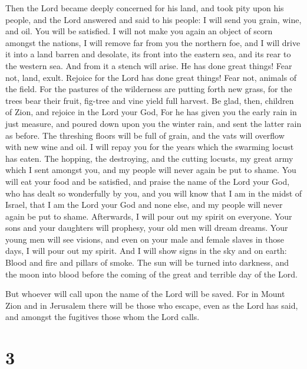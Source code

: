  Then the Lord became deeply concerned for his land, and
took pity upon his people,  and the Lord answered and said
to his people: I will send you grain, wine, and oil. You will be
satisfied. I will not make you again an object of scorn amongst the
nations,  I will remove far from you the northern foe, and
I will drive it into a land barren and desolate, its front into the
eastern sea, and its rear to the western sea. And from it a stench will
arise. He has done great things!  Fear not, land, exult.
Rejoice for the Lord has done great things!  Fear not,
animals of the field. For the pastures of the wilderness are putting
forth new grass, for the trees bear their fruit, fig-tree and vine yield
full harvest.  Be glad, then, children of Zion, and rejoice
in the Lord your God, For he has given you the early rain in just
measure, and poured down upon you the winter rain, and sent the latter
rain as before.  The threshing floors will be full of
grain, and the vats will overflow with new wine and oil.  I
will repay you for the years which the swarming locust has eaten. The
hopping, the destroying, and the cutting locusts, my great army which I
sent amongst you, and my people will never again be put to shame.
 You will eat your food and be satisfied, and praise the
name of the Lord your God, who has dealt so wonderfully by you,
 and you will know that I am in the midst of Israel, that I
am the Lord your God and none else, and my people will never again be
put to shame.  Afterwards, I will pour out my spirit on
everyone. Your sons and your daughters will prophesy, your old men will
dream dreams. Your young men will see visions,  and even on
your male and female slaves in those days, I will pour out my spirit.
 And I will show signs in the sky and on earth: Blood and
fire and pillars of smoke.  The sun will be turned into
darkness, and the moon into blood before the coming of the great and
terrible day of the Lord.

 But whoever will call upon the name of the Lord will be
saved. For in Mount Zion and in Jerusalem there will be those who
escape, even as the Lord has said, and amongst the fugitives those whom
the Lord calls.

\hypertarget{section-1}{%
\section{3}\label{section-1}}

